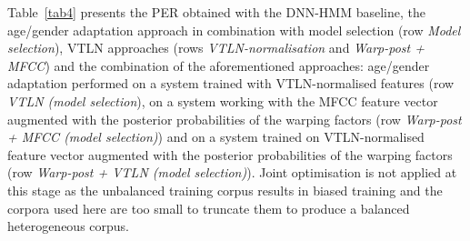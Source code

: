 \documentclass{nle}
\begin{document}

Table~\ref{tab4} presents the PER obtained with the DNN-HMM baseline, the age/gender adaptation approach in combination with model selection (row {\em Model selection}), VTLN approaches (rows {\em VTLN-normalisation} and {\em Warp-post + MFCC}) and the combination of the aforementioned approaches: age/gender adaptation performed on a system trained with VTLN-normalised features (row {\em VTLN (model selection}), on a system working with the MFCC feature vector augmented with the posterior probabilities of the warping factors (row {\em Warp-post + MFCC (model selection)}) and on a system trained on VTLN-normalised feature vector augmented with the posterior probabilities of the warping factors (row {\em Warp-post + VTLN (model selection)}). Joint optimisation is not applied at this stage as the unbalanced training corpus results in biased training and the corpora used here are too small to truncate them to produce a balanced heterogeneous corpus. 
\end{document}
